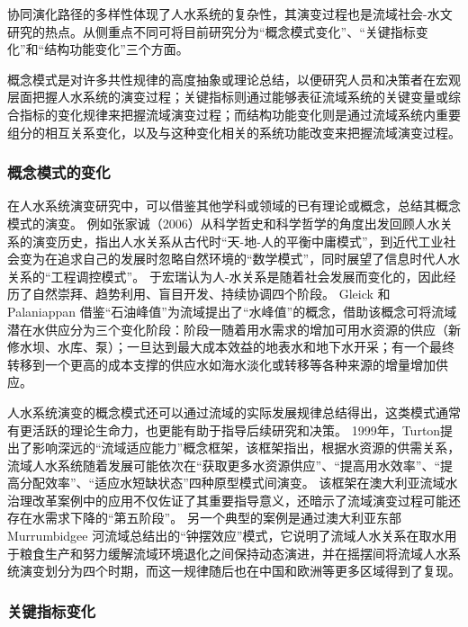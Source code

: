 协同演化路径的多样性体现了人水系统的复杂性，其演变过程也是流域社会-水文研究的热点。从侧重点不同可将目前研究分为“概念模式变化”、“关键指标变化”和“结构功能变化”三个方面。

概念模式是对许多共性规律的高度抽象或理论总结，以便研究人员和决策者在宏观层面把握人水系统的演变过程；关键指标则通过能够表征流域系统的关键变量或综合指标的变化规律来把握流域演变过程；而结构功能变化则是通过流域系统内重要组分的相互关系变化，以及与这种变化相关的系统功能改变来把握流域演变过程。

\subsubsection*{概念模式的变化}

在人水系统演变研究中，可以借鉴其他学科或领域的已有理论或概念，总结其概念模式的演变。
例如张家诚（2006）从科学哲史和科学哲学的角度出发回顾人水关系的演变历史，指出人水关系从古代时“天-地-人的平衡中庸模式”，到近代工业社会变为在追求自己的发展时忽略自然环境的“数学模式”，同时展望了信息时代人水关系的“工程调控模式”\cite{zhang2006}。
于宏瑞认为人-水关系是随着社会发展而变化的，因此经历了自然崇拜、趋势利用、盲目开发、持续协调四个阶段\cite{yuruihong2011}。
Gleick 和 Palaniappan 借鉴“石油峰值”为流域提出了“水峰值”的概念，借助该概念可将流域潜在水供应分为三个变化阶段：阶段一随着用水需求的增加可用水资源的供应（新修水坝、水库、泵）；一旦达到最大成本效益的地表水和地下水开采；有一个最终转移到一个更高的成本支撑的供应水如海水淡化或转移等各种来源的增量增加供应\cite{gleick2010}。

人水系统演变的概念模式还可以通过流域的实际发展规律总结得出，这类模式通常有更活跃的理论生命力，也更能有助于指导后续研究和决策。
1999年，Turton提出了影响深远的“流域适应能力”概念框架，该框架指出，根据水资源的供需关系，流域人水系统随着发展可能依次在“获取更多水资源供应”、“提高用水效率”、“提高分配效率”、“适应水短缺状态”四种原型模式间演变\cite{turton1999}。
该框架在澳大利亚流域水治理改革案例中的应用不仅佐证了其重要指导意义，还暗示了流域演变过程可能还存在水需求下降的“第五阶段”\cite{loch2020}。
另一个典型的案例是通过澳大利亚东部 Murrumbidgee 河流域总结出的“钟摆效应”模式，它说明了流域人水关系在取水用于粮食生产和努力缓解流域环境退化之间保持动态演进，并在摇摆间将流域人水系统演变划分为四个时期\cite{kandasamy2014, roobavannan2017}，而这一规律随后也在中国和欧洲等更多区域得到了复现\cite{han2017, mostert2018}。

\subsubsection*{关键指标变化}


